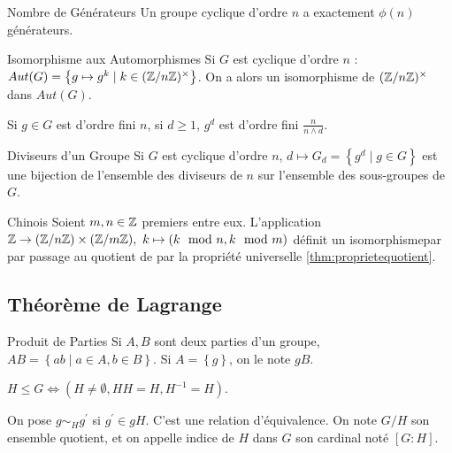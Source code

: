 \documentclass{cours}
\begin{document}
\begin{corollaire}{Nombre de Générateurs}{}
    Un groupe cyclique d'ordre $n$ a exactement $\phi(n)$ générateurs.
\end{corollaire}

\begin{corollaire}{Isomorphisme aux Automorphismes}{}
    Si $G$ est cyclique d'ordre $n$ : $Aut(G) = \left\{g \mapsto g^{k} \mid k \in (\mathbb{Z}/n\mathbb{Z})^{\times}\right\}$. On a alors un isomorphisme de $(\mathbb{Z}/n\mathbb{Z})^{\times}$ dans $Aut(G)$.
\end{corollaire}

\begin{remark}
    Si $g \in G$ est d'ordre fini $n$, si $d \geq 1$, $g^{d}$ est d'ordre fini $\frac{n}{n \wedge d}$.
\end{remark}

\begin{propositionfr}{Diviseurs d'un Groupe}{}
    Si $G$ est cyclique d'ordre $n$, $d \mapsto G_{d} = \left\{g^{d} \mid g \in G\right\}$ est une bijection de l'ensemble des diviseurs de $n$ sur l'ensemble des sous-groupes de $G$.
\end{propositionfr}

\begin{théorème}{Chinois}{}
    Soient $m, n \in \mathbb{Z}$ premiers entre eux. L'application $\mathbb{Z} \rightarrow (\mathbb{Z}/n\mathbb{Z}) \times (\mathbb{Z}/m\mathbb{Z}),\ k \mapsto \left(k \mod n, k \mod m\right)$ définit un isomorphismepar par passage au quotient de par la propriété universelle \ref{thm:proprietequotient}.
\end{théorème}

\subsection{Théorème de Lagrange} %
\begin{définition}{Produit de Parties}{}
    Si $A, B$ sont deux parties d'un groupe, $AB = \left\{ab \mid a \in A, b\in B\right\}$. Si $A = \left\{g\right\}$, on le note $gB$.
\end{définition}
\begin{lemma}
    $H \leq G \Leftrightarrow \left(H \neq \emptyset, HH = H, H^{-1} = H\right)$.
\end{lemma}
\begin{définition}{}{}
    On pose $g\sim_{H}g^{'}$ si $g^{'} \in gH$. C'est une relation d'équivalence. On note $G/H$ son ensemble quotient, et on appelle indice de $H$ dans $G$ son cardinal noté $[G : H]$.
\end{définition}
\end{document}
